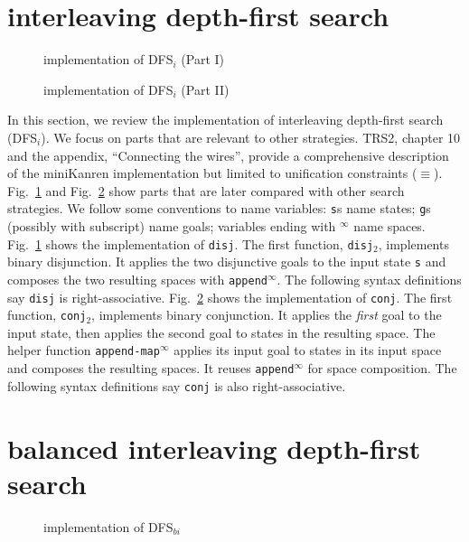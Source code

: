 \documentclass[acmlarge, review=true]{acmart}
\newcommand{\conj}{\texttt{conj}}
\newcommand{\disj}{\texttt{disj}}
\newcommand{\disjtwo}{\texttt{disj$_2$}}
\newcommand{\conjtwo}{\texttt{conj$_2$}}
\newcommand{\appendInf}{\texttt{append$^\infty$}}
\newcommand{\appendMapInf}{\texttt{append-map$^\infty$}}
\newcommand{\DFSi }[0]{DFS$_{i}$}
\newcommand{\DFSbi}[0]{DFS$_{bi}$}
\begin{document}
\section{interleaving depth-first search}

\begin{figure}
	
	\caption{implementation of \DFSi{} (Part I)}
	\label{DFSi-0}
\end{figure}

\begin{figure}
	
	\caption{implementation of \DFSi{} (Part II)}
	\label{DFSi-1}
\end{figure}

In this section, we review the implementation of interleaving depth-first 
search (\DFSi). We focus on parts that are relevant to other strategies. TRS2,
chapter 10 and the appendix, ``Connecting the wires'', 
provide a comprehensive description of the miniKanren 
implementation but limited to unification constraints ($\equiv$).
Fig.~\ref{DFSi-0} and Fig.~\ref{DFSi-1} show parts that are later compared 
with other search strategies. We follow some conventions to name variables: 
\texttt{s}s name states; \texttt{g}s (possibly with subscript) name goals; 
variables ending with $^\infty$ name spaces. Fig.~\ref{DFSi-0} shows 
the 
implementation of \disj. The 
first function, \disjtwo, implements binary disjunction. It applies the 
two disjunctive goals to the input state \texttt{s} and composes the two 
resulting spaces with \appendInf{}. The following syntax 
definitions say \disj{} is right-associative. Fig.~\ref{DFSi-1} 
shows the implementation of \conj. The first function, \conjtwo{}, 
implements binary conjunction. 
It applies the \emph{first} goal to the input state, then applies the second 
goal to states in the resulting space. The helper function 
\appendMapInf{} applies its input goal to states 
in its input space and composes the resulting spaces. It reuses 
\appendInf{} for space composition. The following syntax 
definitions say \conj{} is also right-associative.

\section{balanced interleaving depth-first search}

\begin{figure}
	
	\caption{implementation of \DFSbi{}}
	\label{balanced-disj}
\end{figure}
\end{document}
